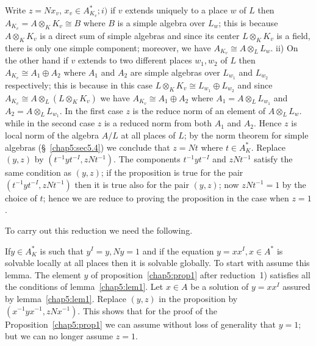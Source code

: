 \begin{reduction}\label{chap5:red1}
Write $z=Nx_v$, $x_v \in A^*_{K_v}; i)$ if $v$ extends uniquely to a place
$w$ of $L$ then $A_{K_v}= A \otimes _K K_v \cong B$ where $B$ is a
simple algebra over $L_w$; this is because $A \otimes_K K_v$ is a
direct sum of simple algebras and since its center $L \otimes_K K_v$
is a field, there is only one simple component; moreover, we have
$A_{K_v} \cong A \otimes_L L_w$. ii) On the other hand if $v$ extends to
two different places $w_1,w_2$ of $L$ then $A_{K_v} \cong A_1 \oplus
A_2$ where $A_1$ and $A_2$ are simple algebras over $L_{w_1}$ and $L_{w_2}$
respectively; this is because in this case $L \otimes _K K_v \cong
L_{w_1} \oplus L_{w_2}$ and since $A_{K_v}\cong A \otimes _L (L
\otimes _K K_v)$ we have $A_{K_v}\cong A_1 \oplus A_2$ where $A_1=A
\otimes _L L_{w_1}$  and $A_2=A \otimes _L L_{w_1}$. In the first case
$z$ is the reduce norm of an element of $A \otimes_L L_w$. while in
the second case $z$ is a reduced norm from both $A_1$ and $A_2$. Hence
$z$  is local 
norm of the algebra $A/L$ at all places of $L$; by the norm theorem
for simple algebras (\S~\ref{chap5:sec5.4})  we conclude that
$z=Nt$ where $t \in 
A^*_K$. Replace $(y,z)$ by $(t^{-1}yt^{-I},zNt^{-1})$. The components
$t^{-1}yt^{-I}$ and $zNt^{-1}$ satisfy the same condition as $(y,z)$;
if the proposition is true for the pair $(t^{-1}yt^{-I},zNt^{-1})$
then it is true also for the pair $(y,z)$; now $zNt^{-1}=1$ by the
choice of $t$; hence we are reduce to proving the proposition in the
case when $z=1$.   
\end{reduction}

\begin{reduction}\label{chap5:red2}
To carry out this reduction we need the following.
\end{reduction}

\setcounter{lem}{0}
\begin{lem}\label{chap5:lem1}%
If\pageoriginale $y \in A^*_K$ is such that $y^I =y,Ny=1$ and if the equation
$y=xx^I, x \in A^*$ is solvable locally at all places then it is
solvable globally. To start with assume this lemma. The element $y$ of
proposition~\ref{chap5:prop1} after reduction~1) satisfies all the conditions of
lemma~\ref{chap5:lem1}. Let $x \in A$ be a solution of $y=xx^I$ assured by 
lemma~\ref{chap5:lem1}. Replace $(y,z)$ in the proposition by $(x^{-1}yx^{-1},
zNx^{-1})$. This shows that for the proof of the Proposition~\ref{chap5:prop1} we
can assume without loss of generality that $y=1$; but  we can no
longer assume $z=1$. 
\end{lem}

